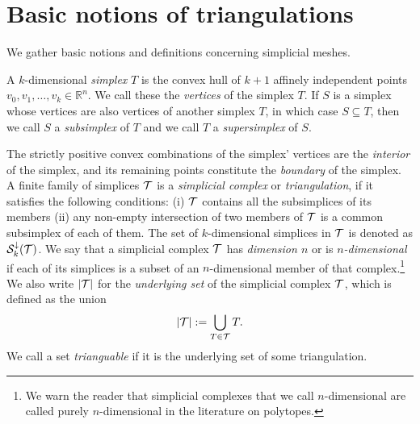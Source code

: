 \documentclass[a4paper]{article}
\begin{document}
\section{Basic notions of triangulations}\label{section:triangulations}

We gather basic notions and definitions concerning simplicial meshes. 
  
A ${k}$-dimensional \emph{simplex} $T$ is the convex hull of ${k}+1$ affinely independent points $v_0, v_1, \ldots, v_{{k}} \in \mathbb{R}^{n}$. We call these the \emph{vertices} of the simplex $T$. 
If $S$ is a simplex whose vertices are also vertices of another simplex $T$, in which case $S \subseteq T$, 
then we call $S$ a \textit{subsimplex} of $T$ and we call $T$ a \textit{supersimplex} of $S$. 

The strictly positive convex combinations of the simplex' vertices are the \textit{interior} of the simplex,
and its remaining points constitute the \textit{boundary} of the simplex.
\\

A finite family of simplices ${\mathcal T}$ is a \emph{simplicial complex} or \emph{triangulation}, if it satisfies the following conditions: 
(i) ${\mathcal T}$ contains all the subsimplices of its members (ii) any non-empty intersection of two members of ${\mathcal T}$ is a common subsimplex of each of them. 
The set of $k$-dimensional simplices in ${\mathcal T}$ is denoted as ${\mathcal S}^{\downarrow}_{{k}}({\mathcal T})$. 
We say that a simplicial complex ${\mathcal T}$ has \textit{dimension $n$} or is \textit{$n$-dimensional} if each of its simplices is a subset of an $n$-dimensional member of that complex.\footnote{We warn the reader that simplicial complexes that we call $n$-dimensional are called purely $n$-dimensional in the literature on polytopes.} 
We also write $\left| {\mathcal T} \right|$ for the \textit{underlying set} of the simplicial complex ${\mathcal T}$, which is defined as the union 
\begin{align*}
    \left| {\mathcal T} \right| := \bigcup_{ T \in {\mathcal T} } T
    .
\end{align*}
We call a set \textit{trianguable} if it is the underlying set of some triangulation. 
\end{document}
